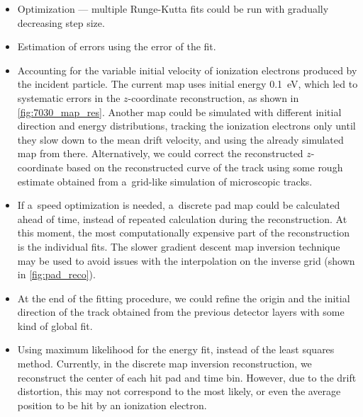 		\begin{itemize}
			\item Optimization --- multiple Runge-Kutta fits could be run with gradually decreasing step size.
			\item Estimation of errors using the error of the fit.
			\item Accounting for the variable initial velocity of ionization electrons produced by the incident particle. The current map uses initial energy \qty{0.1}{\eV}, which led to systematic errors in the $z$\nobreakdash-coordinate reconstruction, as shown in \cref{fig:7030_map_res}. Another map could be simulated with different initial direction and energy distributions, tracking the ionization electrons only until they slow down to the mean drift velocity, and using the already simulated map from there. Alternatively, we could correct the reconstructed $z$\nobreakdash-coordinate based on the reconstructed curve of the track using some rough estimate obtained from a~grid-like simulation of microscopic tracks.
			\item If a~speed optimization is needed, a~discrete pad map could be calculated ahead of time, instead of repeated calculation during the reconstruction. At this moment, the most computationally expensive part of the reconstruction is the individual fits. The slower gradient descent map inversion technique may be used to avoid issues with the interpolation on the inverse grid (shown in \cref{fig:pad_reco}).
			\item At the end of the fitting procedure, we could refine the origin and the initial direction of the track obtained from the previous detector layers with some kind of global fit.
			\item Using maximum likelihood for the energy fit, instead of the least squares method. Currently, in the discrete map inversion reconstruction, we reconstruct the center of each hit pad and time bin. However, due to the drift distortion, this may not correspond to the most likely, or even the average position to be hit by an ionization electron.
			

\end{itemize}
